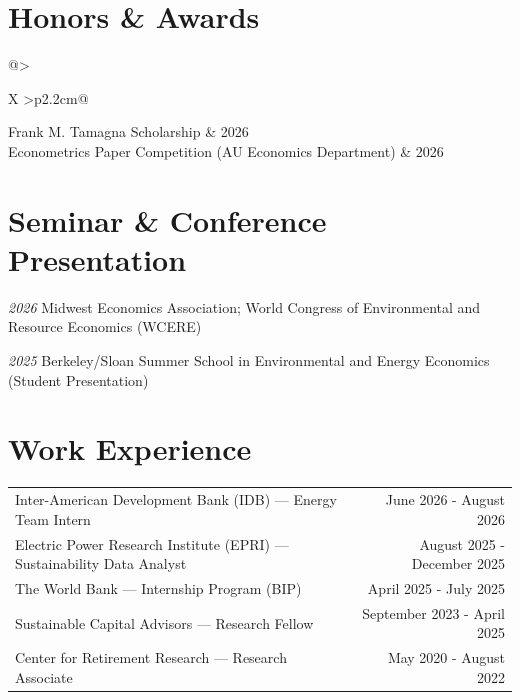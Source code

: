 \documentclass[a4paper,12pt]{article}
\begin{document}

\section{Honors \& Awards}

\begin{tabularx}{\linewidth}{@{}>{\hspace{1em}\raggedright\arraybackslash}X
                                >{\hspace{0.75em}\raggedleft\arraybackslash}p{2.2cm}@{}}
Frank M. Tamagna Scholarship & 2026 \\
Econometrics Paper Competition (AU Economics Department) & 2026 \\
\end{tabularx}



\section{Seminar \& Conference Presentation}

\textit{2026} Midwest Economics Association; World Congress of Environmental and Resource Economics (WCERE)

\textit{2025} Berkeley/Sloan Summer School in Environmental and Energy Economics (Student Presentation)




\section{Work Experience}

\begin{tabularx}{\linewidth}{@{}>{\raggedright\arraybackslash}X r@{}}
Inter-American Development Bank (IDB) — Energy Team Intern & June 2026 - August 2026 \\
Electric Power Research Institute (EPRI) — Sustainability Data Analyst & August 2025 - December 2025 \\
The World Bank — Internship Program (BIP)                            & April 2025 - July 2025 \\
Sustainable Capital Advisors — Research Fellow                       & September 2023 - April 2025 \\
Center for Retirement Research — Research Associate                   & May 2020 - August 2022 \\
\end{tabularx}
\end{document}
